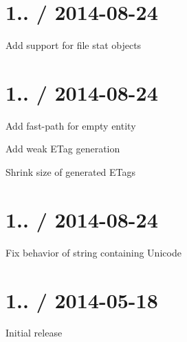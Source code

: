 \section*{1.. / 2014-\/08-\/24 }


\begin{DoxyItemize}
\item Add support for file stat objects
\end{DoxyItemize}

\section*{1.. / 2014-\/08-\/24 }


\begin{DoxyItemize}
\item Add fast-\/path for empty entity
\item Add weak E\+Tag generation
\item Shrink size of generated E\+Tags
\end{DoxyItemize}

\section*{1.. / 2014-\/08-\/24 }


\begin{DoxyItemize}
\item Fix behavior of string containing Unicode
\end{DoxyItemize}

\section*{1.. / 2014-\/05-\/18 }


\begin{DoxyItemize}
\item Initial release 
\end{DoxyItemize}